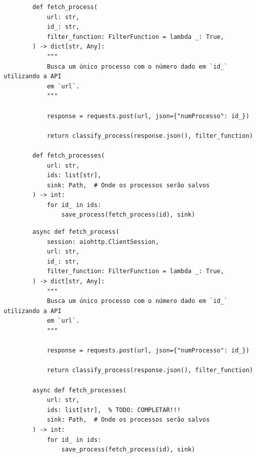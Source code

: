 \begin{listing}[htb]
    \begin{verbatim}
        def fetch_process(
            url: str,
            id_: str,
            filter_function: FilterFunction = lambda _: True,
        ) -> dict[str, Any]:
            """
            Busca um único processo com o número dado em `id_` utilizando a API
            em `url`.
            """

            response = requests.post(url, json={"numProcesso": id_})

            return classify_process(response.json(), filter_function)

        def fetch_processes(
            url: str,
            ids: list[str],
            sink: Path,  # Onde os processos serão salvos
        ) -> int:
            for id_ in ids:
                save_process(fetch_process(id), sink)
    \end{verbatim}
    \caption{%
        Reprodução do procedimento de busca por processos de maneira sequencial
        (síncrona).
    }
    \label{lst:requisição-processos-síncrona}
\end{listing}

\begin{listing}[htb]
    \begin{verbatim}
        async def fetch_process(
            session: aiohttp.ClientSession,
            url: str,
            id_: str,
            filter_function: FilterFunction = lambda _: True,
        ) -> dict[str, Any]:
            """
            Busca um único processo com o número dado em `id_` utilizando a API
            em `url`.
            """

            response = requests.post(url, json={"numProcesso": id_})

            return classify_process(response.json(), filter_function)

        async def fetch_processes(
            url: str,
            ids: list[str],  % TODO: COMPLETAR!!!
            sink: Path,  # Onde os processos serão salvos
        ) -> int:
            for id_ in ids:
                save_process(fetch_process(id), sink)
    \end{verbatim}
    \caption{%
        Reprodução do procedimento de busca por processos de maneira
        concorrente não-bloqueante (assíncrona).
    }
    \label{lst:requisição-processos-assíncrona}
\end{listing}


